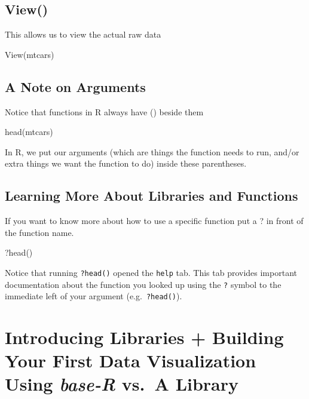 \documentclass[
]{book}
\newenvironment{Shaded}{\begin{snugshade}}{\end{snugshade}}
\newcommand{\FunctionTok}[1]{\textcolor[rgb]{0.00,0.00,0.00}{#1}}
\newcommand{\NormalTok}[1]{#1}
\begin{document}
\hypertarget{view}{%
\section{View()}\label{view}}

This allows us to view the actual raw data

\begin{Shaded}
\begin{Highlighting}[]
\FunctionTok{View}\NormalTok{(mtcars)}
\end{Highlighting}
\end{Shaded}

\hypertarget{a-note-on-arguments}{%
\section{A Note on Arguments}\label{a-note-on-arguments}}

Notice that functions in R always have () beside them

head(mtcars)

In R, we put our arguments (which are things the function needs to run, and/or extra things we want the function to do) inside these parentheses.

\hypertarget{learning-more-about-libraries-and-functions}{%
\section{Learning More About Libraries and Functions}\label{learning-more-about-libraries-and-functions}}

If you want to know more about how to use a specific function put a ? in front of the function name.

\begin{Shaded}
\begin{Highlighting}[]
\NormalTok{?}\FunctionTok{head}\NormalTok{()}
\end{Highlighting}
\end{Shaded}

Notice that running \texttt{?head()} opened the \texttt{help} tab. This tab provides important documentation about the function you looked up using the \texttt{?} symbol to the immediate left of your argument (e.g.~\texttt{?head()}).

\hypertarget{introducing-libraries-building-your-first-data-visualization-using-base-r-vs.-a-library}{%
\chapter{\texorpdfstring{Introducing Libraries + Building Your First Data Visualization Using \emph{base-R} vs.~A Library}{Introducing Libraries + Building Your First Data Visualization Using base-R vs.~A Library}}\label{introducing-libraries-building-your-first-data-visualization-using-base-r-vs.-a-library}}
\end{document}
